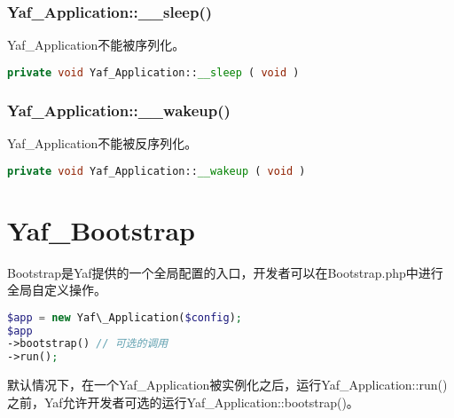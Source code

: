 \begin{lstlisting}[language=PHP]

\end{lstlisting}



\begin{lstlisting}[language=PHP]

\end{lstlisting}


\subsection{Yaf\_Application::\_\_sleep()}

Yaf\_Application不能被序列化。






\begin{lstlisting}[language=PHP]
private void Yaf_Application::__sleep ( void )
\end{lstlisting}



\subsection{Yaf\_Application::\_\_wakeup()}

Yaf\_Application不能被反序列化。







\begin{lstlisting}[language=PHP]
private void Yaf_Application::__wakeup ( void )
\end{lstlisting}

\chapter{Yaf\_Bootstrap}

Bootstrap是Yaf提供的一个全局配置的入口，开发者可以在Bootstrap.php中进行全局自定义操作。

\begin{lstlisting}[language=PHP]
$app = new Yaf\_Application($config);
$app
->bootstrap() // 可选的调用
->run();
\end{lstlisting}


默认情况下，在一个Yaf\_Application被实例化之后，运行Yaf\_Application::run()之前，Yaf允许开发者可选的运行Yaf\_Application::bootstrap()。

